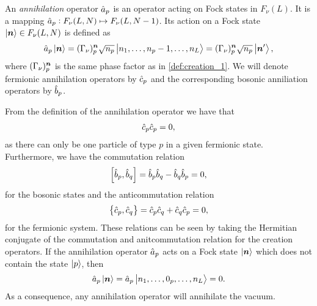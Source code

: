             \begin{definition}
                \label{def:annihilation_1}
                An \emph{annihilation} operator $\hat{a}_{p}$ is an operator acting
                on Fock states in $F_{\nu}(L)$.
                It is a mapping $\hat{a}_{p}: F_{\nu}(L, N) \mapsto F_{\nu}(L, N -
                1)$.
                Its action on a Fock state $\ket{\boldsymbol{n}} \in F_{\nu}(L, N)$ is
                defined as
                \begin{align}
                    \hat{a}_{p}\ket{\boldsymbol{n}}
                    = (\Gamma_{\nu})^{\boldsymbol{n}}_{p}
                    \sqrt{n_p}
                    \ket{n_1, \dots, n_p - 1, \dots, n_L}
                    = (\Gamma_{\nu})^{\boldsymbol{n}}_{p}
                    \sqrt{n_p}
                    \ket{\boldsymbol{n}'},
                \end{align}
                where $(\Gamma_{\nu})^{\boldsymbol{n}}_{p}$ is the same phase factor as
                in \autoref{def:creation_1}.
                We will denote fermionic annihilation operators by $\hat{c}_{p}$ and
                the corresponding bosonic anniliation operators by $\hat{b}_{p}$.
            \end{definition}
            From the definition of the annihilation operator we have that
            \begin{align}
                \hat{c}_{p}\hat{c}_{p} = 0,
            \end{align}
            as there can only be one particle of type $p$ in a given fermionic
            state.
            Furthermore, we have the commutation relation
            \begin{align}
                \left[\hat{b}_{p}, \hat{b}_{q}\right] = \hat{b}_{p}\hat{b}_{q} - \hat{b}_{q}\hat{b}_{p} = 0,
            \end{align}
            for the bosonic states and the anticommutation relation
            \begin{align}
                \left\{\hat{c}_{p}, \hat{c}_{q}\right\} = \hat{c}_{p}\hat{c}_{q} + \hat{c}_{q}\hat{c}_{p} = 0,
            \end{align}
            for the fermionic system.
            These relations can be seen by taking the Hermitian conjugate of the
            commutation and anitcommutation relation for the creation operators.
            If the annihilation operator $\hat{a}_{p}$ acts on a Fock state
            $\ket{\boldsymbol{n}}$ which does not contain the state $\ket{p}$, then
            \begin{align}
                \hat{a}_{p}\ket{\boldsymbol{n}}
                = \hat{a}_{p}\ket{n_1, \dots, 0_p, \dots, n_L}
                = 0.
            \end{align}
            As a consequence, any annihilation operator will annihilate the
            vacuum.

